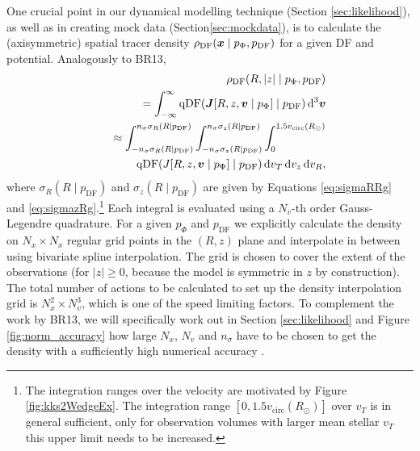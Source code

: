One crucial point in our dynamical modelling technique (Section \ref{sec:likelihood}), as well as in creating mock data (Section\ref{sec:mockdata}), is to calculate the (axisymmetric) spatial tracer density $\rho_\text{DF}(\boldsymbol{x} \mid p_{\Phi},p_\text{DF})$ for a given DF and potential. Analogously to BR13, 
\begin{eqnarray}
&&\rho_\text{DF}(R,|z| \mid p_{\Phi},p_\text{DF}) \nonumber\\
&&= \int_{-\infty}^{\infty} \text{qDF}(\vect{J}[R,z,\vect{v} \mid p_{\Phi}] \mid p_\text{DF}) \Diff3\vect{v}  \\%
&&\approx \int_{-n_\sigma \sigma_R(R \mid p_\text{DF})}^{n_\sigma \sigma_R(R \mid p_\text{DF})} \int_{-n_\sigma\sigma_z(R \mid p_\text{DF})}^{n_\sigma \sigma_z(R \mid p_\text{DF})} \int_{0}^{1.5 v_\text{circ}(R_\odot)}  \nonumber\\
& & \hspace{1cm} \text{qDF}(J[R,z,\vect{v} \mid p_{\Phi}] \mid p_\text{DF}) \diff v_T \diff v_z \diff v_R, \label{eq:tracerdensity}
\end{eqnarray}
where $\sigma_R(R \mid p_\text{DF})$ and $\sigma_z(R \mid p_\text{DF})$ are given by Equations \ref{eq:sigmaRRg} and \ref{eq:sigmazRg}.\footnote{The integration ranges over the velocity are motivated by Figure \ref{fig:kks2WedgeEx}. The integration range $[0,1.5 v_\text{circ}(R_\odot)]$ over $v_T$ is in general sufficient, only for observation volumes with larger mean stellar $v_T$ this upper limit needs to be increased.} Each integral is evaluated using a $N_v$-th order Gauss-Legendre quadrature. For a given $p_\Phi$ and $p_\text{DF}$ we explicitly calculate the density on $N_x \times N_x$ regular grid points in the $(R,z)$ plane and interpolate in between using bivariate spline interpolation. The grid is chosen to cover the extent of the observations (for $|z|\geq0$, because the model is symmetric in $z$ by construction). The total number of actions to be calculated to set up the density interpolation grid is $N_x^2 \times N_v^3$, which is one of the speed limiting factors. To complement the work by BR13, we will specifically work out in Section \ref{sec:likelihood} and Figure \ref{fig:norm_accuracy} how large $N_x$, $N_v$ and $n_\sigma$ have to be chosen to get the density with a sufficiently high numerical accuracy . 


